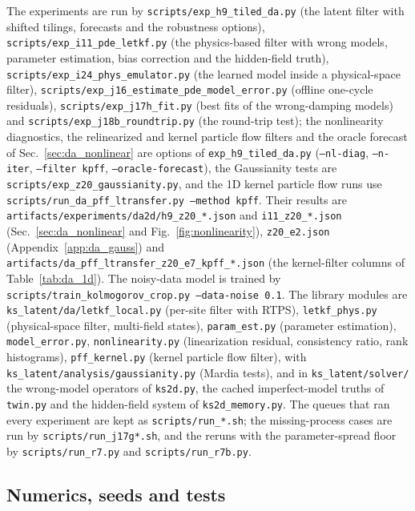The experiments are run by \texttt{scripts/exp\_h9\_tiled\_da.py} (the latent
filter with shifted tilings, forecasts and the robustness options),
\texttt{scripts/exp\_i11\_pde\_letkf.py} (the physics-based filter with wrong
models, parameter estimation, bias correction and the hidden-field truth),
\texttt{scripts/exp\_i24\_phys\_emulator.py} (the learned model inside a
physical-space filter), \texttt{scripts/exp\_j16\_estimate\_pde\_model\_error.py}
(offline one-cycle residuals), \texttt{scripts/exp\_j17h\_fit.py} (best fits of
the wrong-damping models) and \texttt{scripts/exp\_j18b\_roundtrip.py} (the
round-trip test); the nonlinearity diagnostics, the relinearized and kernel
particle flow filters and the oracle forecast of Sec.~\ref{sec:da_nonlinear} are
options of \texttt{exp\_h9\_tiled\_da.py} (\texttt{--nl-diag}, \texttt{--n-iter},
\texttt{--filter kpff}, \texttt{--oracle-forecast}), the Gaussianity tests are
\texttt{scripts/exp\_z20\_gaussianity.py}, and the 1D kernel particle flow runs
use \texttt{scripts/run\_da\_pff\_ltransfer.py --method kpff}. Their results are
\texttt{artifacts/experiments/da2d/h9\_z20\_*.json} and \texttt{i11\_z20\_*.json}
(Sec.~\ref{sec:da_nonlinear} and Fig.~\ref{fig:nonlinearity}), \texttt{z20\_e2.json}
(Appendix~\ref{app:da_gauss}) and \texttt{artifacts/da\_pff\_ltransfer\_z20\_e7\_kpff\_*.json}
(the kernel-filter columns of Table~\ref{tab:da_1d}). The noisy-data model is trained by
\texttt{scripts/train\_kolmogorov\_crop.py --data-noise 0.1}. The library
modules are \texttt{ks\_latent/da/letkf\_local.py} (per-site filter with
RTPS), \texttt{letkf\_phys.py} (physical-space filter, multi-field states),
\texttt{param\_est.py} (parameter estimation), \texttt{model\_error.py},
\texttt{nonlinearity.py} (linearization residual, consistency ratio, rank
histograms), \texttt{pff\_kernel.py} (kernel particle flow filter), with
\texttt{ks\_latent/analysis/gaussianity.py} (Mardia tests), and in
\texttt{ks\_latent/solver/} the wrong-model operators of \texttt{ks2d.py}, the
cached imperfect-model truths of \texttt{twin.py} and the hidden-field system
of \texttt{ks2d\_memory.py}. The queues that ran every experiment are kept as
\texttt{scripts/run\_*.sh}; the missing-process cases are run by \texttt{scripts/run\_j17g*.sh}, and the
reruns with the parameter-spread floor by \texttt{scripts/run\_r7.py} and \texttt{scripts/run\_r7b.py}.

\subsection{Numerics, seeds and tests}

